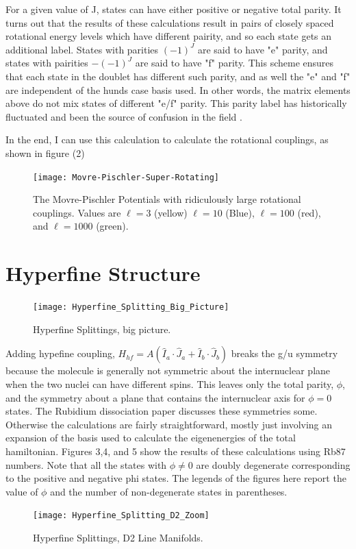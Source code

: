 \documentclass[prl, longbibliography]{revtex4-2}
\begin{document}
For a given value of J, states can have either positive or negative total parity. It turns out that the results of these calculations result in pairs of closely spaced rotational energy levels which have different pairity, and so each state gets an additional label. States with parities $(-1)^J$ are said to have "e" parity, and states with pairities $-(-1)^J$ are said to have "f" parity. This scheme ensures that each state in the doublet has different such parity, and as well the "e" and "f" are independent of the hunds case basis used. In other words, the matrix elements above do not mix states of different "e/f" parity. This parity label has historically fluctuated and been the source of confusion in the field \cite{hornkohl_parity_2017,brown_labeling_1975}.

In the end, I can use this calculation to calculate the rotational couplings, as shown in figure (2)
\begin{figure}
  \centering
    \texttt{[image: Movre-Pischler-Super-Rotating]}
    \caption{The Movre-Pischler Potentials with ridiculously large rotational couplings. Values are $\ell=3$ (yellow) $\ell=10$ (Blue), $\ell=100$ (red), and $\ell=1000$ (green). }
\end{figure}

\section{Hyperfine Structure} 

\begin{figure}
  \centering
    \texttt{[image: Hyperfine\_Splitting\_Big\_Picture]}
    \caption{Hyperfine Splittings, big picture. }
\end{figure}



Adding hypefine coupling, $H_{hf} = A(\hat{I}_a\cdot\hat{J}_a+\hat{I}_b\cdot\hat{J}_b)$ breaks the g/u symmetry because the molecule is generally not symmetric about the internuclear plane when the two nuclei can have different spins. This leaves only the total parity, $\phi$, and the symmetry about a plane that contains the internuclear axis for $\phi=0$ states. The Rubidium dissociation paper\cite{kemmann_near-threshold_2004} discusses these symmetries some. Otherwise the calculations are fairly straightforward, mostly just involving an expansion of the basis used to calculate the eigenenergies of the total hamiltonian. Figures 3,4, and 5 show the results of these calculations using Rb87 numbers. Note that all the states with $\phi\neq 0$ are doubly degenerate corresponding to the positive and negative phi states. The legends of the figures here report the value of $\phi$ and the number of non-degenerate states in parentheses. 
\begin{figure}
  \centering
    \texttt{[image: Hyperfine\_Splitting\_D2\_Zoom]}
    \caption{Hyperfine Splittings, D2 Line Manifolds. }
\end{figure}
\end{document}
